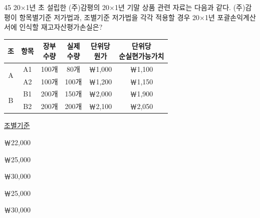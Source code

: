 \begin{question}{45}
20×1년 초 설립한 (주)감평의 20×1년 기말 상품 관련 자료는 다음과 같다. (주)감평이 항목별기준 저가법과, 조별기준 저가법을 각각 적용할 경우 20×1년 포괄손익계산서에 인식할 재고자산평가손실은?
\par
{\small\centering
\begin{tabular}{|c|c|c|c|c|c|}\hline
조 & 항목 & \makecell{장부\\수량} & \makecell{실제\\수량} & \makecell{단위당\\원가} & \makecell{단위당\\순실현가능가치} \\\hline
\multirow{2}{*}{A} & A1 & 100개 & 80개 & ￦1,000 & ￦1,100 \\\cline{2-6}
 & A2 & 100개 & 100개 & ￦1,200 & ￦1,150 \\\hline
\multirow{2}{*}{B} & B1 & 200개 & 150개 & ￦2,000 & ￦1,900 \\\cline{2-6}
 & B2 & 200개 & 200개 & ￦2,100 & ￦2,050 \\\hline
\end{tabular}\par}
\hspace*{2.4em}\uline{조별기준} \par
\begin{choices}
  \item {}￦22,000
  \item {}￦25,000
  \item {}￦30,000
  \item {}￦25,000
  \item {}￦30,000
\end{choices}
\end{question}
